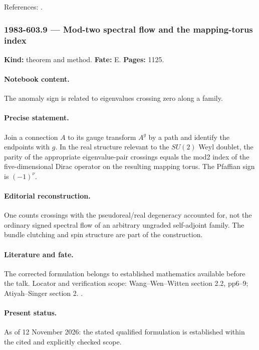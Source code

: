 \noindent References: \citep{wangwenwitten2019new}.\par

\subsubsection{1983-603.9 --- Mod-two spectral flow and the mapping-torus index}

\label{item:1983-603.9}

\noindent\textbf{Kind:} theorem and method. \textbf{Fate:} E. \textbf{Pages:} 1125.\par

\paragraph{Notebook content.} The anomaly sign is related to eigenvalues crossing zero along a family.

\paragraph{Precise statement.} Join a connection \(A\) to its gauge transform \(A^g\) by a path and identify the endpoints with \(g\). In the real structure relevant to the \(SU(2)\) Weyl doublet, the parity of the appropriate eigenvalue-pair crossings equals the mod2 index of the five-dimensional Dirac operator on the resulting mapping torus. The Pfaffian sign is \((-1)^\nu\).

\paragraph{Editorial reconstruction.} One counts crossings with the pseudoreal/real degeneracy accounted for, not the ordinary signed spectral flow of an arbitrary ungraded self-adjoint family. The bundle clutching and spin structure are part of the construction.

\paragraph{Literature and fate.} The corrected formulation belongs to established mathematics available before the talk. Locator and verification scope: Wang--Wen--Witten section 2.2, pp6--9; Atiyah--Singer section 2. \cite{witten1982anomaly,wangwenwitten2019new,atiyahsinger1971index5}.

\paragraph{Present status.} As of 12 November 2026: the stated qualified formulation is established within the cited and explicitly checked scope.

